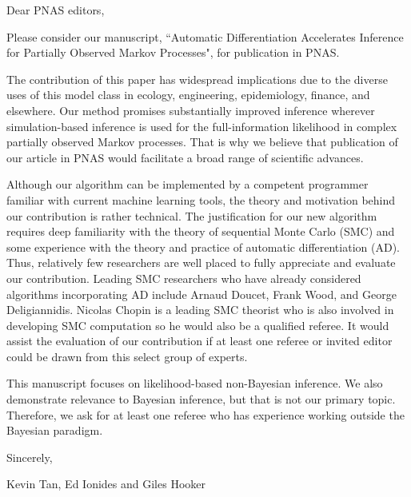 \documentclass[11pt]{article}
\begin{document}
\noindent Dear PNAS editors,
\newline

Please consider our manuscript, ``Automatic Differentiation Accelerates Inference for Partially Observed Markov Processes", for publication in PNAS.

The contribution of this paper has widespread implications due to the diverse uses of this model class in ecology, engineering, epidemiology, finance, and elsewhere. Our method promises substantially improved inference wherever simulation-based inference is used for the full-information likelihood in complex partially observed Markov processes. That is why we believe that publication of our article in PNAS would facilitate a broad range of scientific advances. 

Although our algorithm can be implemented by a competent programmer familiar with current machine learning tools, the theory and motivation behind our contribution is rather technical. The justification for our new algorithm requires deep familiarity with the theory of sequential Monte Carlo (SMC) and some experience with the theory and practice of automatic differentiation (AD). Thus, relatively few researchers are well placed to fully appreciate and evaluate our contribution. Leading SMC researchers who have already considered algorithms incorporating AD include Arnaud Doucet, Frank Wood, and George Deligiannidis. Nicolas Chopin is a leading SMC theorist who is also involved in developing SMC computation so he would also be a qualified referee. It would assist the evaluation of our contribution if at least one referee or invited editor could be drawn from this select group of experts.

This manuscript focuses on likelihood-based non-Bayesian inference. We also demonstrate relevance to Bayesian inference, but that is not our primary topic. Therefore, we ask for at least one referee who has experience working outside the Bayesian paradigm.

\vspace{3ex}

\noindent Sincerely,

\noindent Kevin Tan, Ed Ionides and Giles Hooker
\end{document}
